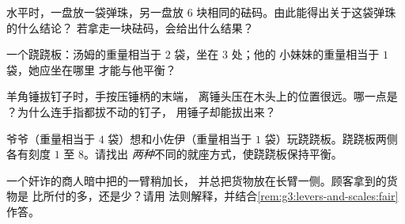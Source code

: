 \begin{exercise}[$\star$]\label{exo:g3:levers-and-scales:7}
水平时，一盘放一袋弹珠，另一盘放 $6$
块相同的砝码。由此能得出关于这袋弹珠的什么结论？
若拿走一块砝码，会给出什么结果？
\end{exercise}

\begin{exercise}[$\star$]\label{exo:g3:levers-and-scales:8}
一个跷跷板：汤姆的重量相当于 $2$ 袋，坐在 $3$ 处；他的
小妹妹的重量相当于 $1$ 袋，她应坐在哪里
才能与他平衡？
\end{exercise}

\begin{exercise}[$\star$]\label{exo:g3:levers-and-scales:9}
羊角锤拔钉子时，手按压锤柄的末端，
离锤头压在木头上的位置很远。哪一点是
？为什么连手指都拔不动的钉子，
用锤子却能拔出来？
\end{exercise}

\begin{exercise}[$\star\star$]\label{exo:g3:levers-and-scales:10}
爷爷（重量相当于 $4$ 袋）想和小佐伊（重量相当于
$1$ 袋）玩跷跷板。跷跷板两侧各有刻度 $1$ 至 $8$。请找出
\emph{两种}不同的就座方式，使跷跷板保持平衡。
\end{exercise}

\begin{exercise}[$\star\star$]\label{exo:g3:levers-and-scales:11}
一个奸诈的商人暗中把的一臂稍加长，
并总把货物放在长臂一侧。顾客拿到的货物是
比所付的多，还是少？请用
法则解释，并结合\cref{rem:g3:levers-and-scales:fair}作答。
\end{exercise}
